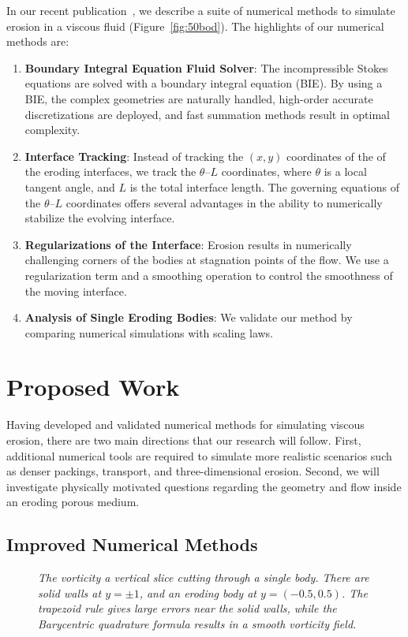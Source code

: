 \documentclass[11pt]{article}
\newcommand{\thL}{$\theta$--$L$}
\begin{document}
In our recent publication~\cite{qua-moo2018}, we describe a suite of
numerical methods to simulate erosion in a viscous fluid
(Figure~\ref{fig:50bod}).  The highlights of our numerical methods are:
\begin{enumerate}[topsep=0pt,itemsep=-1ex,partopsep=1ex,parsep=1ex]
  \item {\bf Boundary Integral Equation Fluid Solver}: The
  incompressible Stokes equations are solved with a boundary integral
  equation (BIE).  By using a BIE, the complex geometries are naturally
  handled, high-order accurate discretizations are deployed, and fast
  summation methods result in optimal complexity.

  \item {\bf Interface Tracking}: Instead of tracking the $(x,y)$
  coordinates of the of the eroding interfaces, we track the {\thL}
  coordinates, where $\theta$ is a local tangent angle, and $L$ is the
  total interface length.  The governing equations of the {\thL}
  coordinates offers several advantages in the ability to numerically
  stabilize the evolving interface.

  \item {\bf Regularizations of the Interface}: Erosion results in
  numerically challenging corners of the bodies at stagnation points of
  the flow.  We use a regularization term and a smoothing operation to
  control the smoothness of the moving interface.

  \item {\bf Analysis of Single Eroding Bodies}: We validate our method
  by comparing numerical simulations with scaling laws.
\end{enumerate}

\section{Proposed Work}
Having developed and validated numerical methods for simulating viscous
erosion, there are two main directions that our research will follow.
First, additional numerical tools are required to simulate more
realistic scenarios such as denser packings, transport, and
three-dimensional erosion.  Second, we will investigate physically
motivated questions regarding the geometry and flow inside an eroding
porous medium.

\subsection{Improved Numerical Methods}
\begin{figure}
\centering

\caption{\label{fig:vort1} \em The vorticity a vertical slice cutting
through a single body.  There are solid walls at $y = \pm 1$, and an
eroding body at $y = (-0.5,0.5)$.  The trapezoid rule gives large errors
near the solid walls, while the Barycentric quadrature formula results
in a smooth vorticity field.}
\end{figure}
\end{document}
